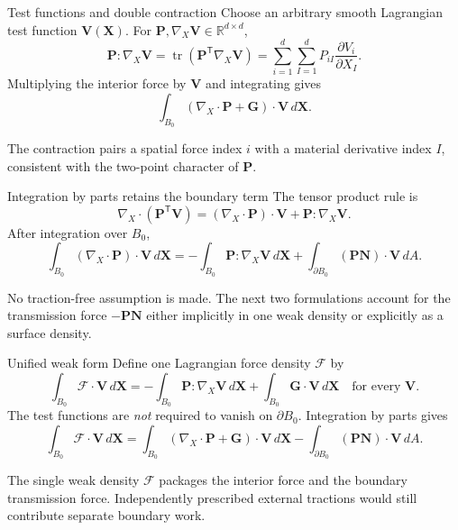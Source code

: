 \documentclass[aspectratio=169,11pt]{beamer}
\newcommand{\Xvec}{\bm{X}}
\newcommand{\Fvec}{\bm{\mathcal{F}}}
\newcommand{\Gvec}{\bm{G}}
\newcommand{\Vvec}{\bm{V}}
\newcommand{\Nvec}{\bm{N}}
\newcommand{\Pten}{\bm{P}}
\newcommand{\Grad}{\nabla_{\!X}}
\newcommand{\Div}{\nabla_{\!X}\!\cdot}
\begin{document}
\begin{frame}{Test functions and double contraction}
Choose an arbitrary smooth Lagrangian test function \(\Vvec(\Xvec)\). For \(\Pten,\Grad\Vvec\in\mathbb{R}^{d\times d}\),
\[
  \Pten:\Grad\Vvec
  =\operatorname{tr}\!\left(\Pten^{\mathsf T}\Grad\Vvec\right)
  =\sum_{i=1}^{d}\sum_{I=1}^{d}
  P_{iI}\frac{\partial V_i}{\partial X_I}.
\]
Multiplying the interior force by \(\Vvec\) and integrating gives
\[
  \int_{B_0}(\Div\Pten+\Gvec)\cdot\Vvec\,d\Xvec .
\]
\begin{punchbox}
\small The contraction pairs a spatial force index \(i\) with a material derivative index \(I\), consistent with the two-point character of \(\Pten\).
\end{punchbox}
\end{frame}

\begin{frame}{Integration by parts retains the boundary term}
The tensor product rule is
\[
  \Div(\Pten^{\mathsf T}\Vvec)
  =
  (\Div\Pten)\cdot\Vvec
  +\Pten:\Grad\Vvec .
\]
After integration over \(B_0\),
\[
  \int_{B_0}(\Div\Pten)\cdot\Vvec\,d\Xvec
  =
  -\int_{B_0}\Pten:\Grad\Vvec\,d\Xvec
  +\int_{\partial B_0}(\Pten\Nvec)\cdot\Vvec\,dA .
\]
\begin{punchbox}
\small No traction-free assumption is made. The next two formulations account for the transmission force \(-\Pten\Nvec\) either implicitly in one weak density or explicitly as a surface density.
\end{punchbox}
\end{frame}

\begin{frame}{Unified weak form}
Define one Lagrangian force density \(\Fvec\) by
\[
\boxed{
  \int_{B_0}\Fvec\cdot\Vvec\,d\Xvec
  =
  -\int_{B_0}\Pten:\Grad\Vvec\,d\Xvec
  +\int_{B_0}\Gvec\cdot\Vvec\,d\Xvec
  \quad\text{for every }\Vvec
}.
\]
The test functions are \emph{not} required to vanish on \(\partial B_0\). Integration by parts gives
\[
  \int_{B_0}\Fvec\cdot\Vvec\,d\Xvec
  =
  \int_{B_0}(\Div\Pten+\Gvec)\cdot\Vvec\,d\Xvec
  -\int_{\partial B_0}(\Pten\Nvec)\cdot\Vvec\,dA .
\]
\begin{punchbox}
\small The single weak density \(\Fvec\) packages the interior force and the boundary transmission force. Independently prescribed external tractions would still contribute separate boundary work.
\end{punchbox}
\end{frame}
\end{document}
